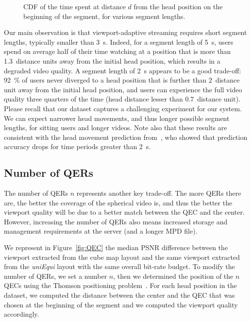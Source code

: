 \begin{figure}
\centering

\caption{CDF of the time spent at distance $d$ from the head position on the beginning of the
segment, for various segment lengths.}\label{cdf-dataset}
\end{figure}

Our main observation is that viewport-adaptive streaming requires
short segment lengths, typically smaller than \SI{3}{\second}. Indeed,
for a segment length of \SI{5}{\second}, users spend on average half of
their time watching at a position that is more than
\num{1.3}~distance units away from the initial head position, which
results in a degraded video quality. A segment length of
\SI{2}{\second} appears to be a good trade-off: \SI{92}{\percent} of
users never diverged to a head position that is further than
\num{2}~distance unit away from the initial head position, and users
can experience the full video quality three quarters of the time (head distance
lesser than \num{0.7}~distance unit). Please recall that our dataset
captures a challenging experiment for our system. We can expect
narrower head movements, and thus longer possible segment lengths, for
sitting users and longer videos. Note also that these results are consistent
with the head movement prediction from~\citet{allthings}, who showed that
prediction accuracy drops for time periods greater than \SI{2}{\second}.

\subsection{Number of \acp{QER}}

The number of \acp{QER} $n$ represents another key trade-off. The more
\acp{QER} there are, the better the coverage of the spherical video
is, and thus the better the viewport quality will be due to a better
match between the \ac{QEC} and the \FoV{} center. However,
increasing the number of \acp{QER} also means increased storage and
management requirements at the server (and a longer \ac{MPD} file).


We represent in Figure~\ref{fig:QEC} the median \ac{PSNR} difference
between the viewport extracted from the cube map layout and the
same viewport extracted from the \emph{uniEqui} layout with the same
overall bit-rate budget. To modify the number of \acp{QER}, we set a
number $n$, then we determined the position of the $n$ \acp{QEC}
using the Thomson positioning problem~\cite{rakhmanov1994electrons}.
For each head position in the dataset, we computed the distance
between the \FoV{} center and the \ac{QEC} that was chosen at the
beginning of the segment and we computed the viewport quality
accordingly.


